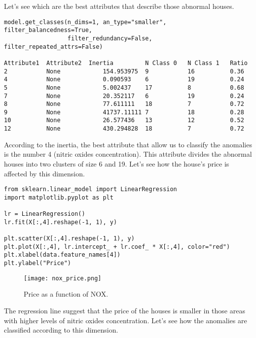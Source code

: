 Let's see which are the best attributes that describe those abnormal houses.

\begin{sourcecode}
{\scriptsize \begin{verbatim}
model.get_classes(n_dims=1, an_type="smaller", filter_balancedness=True,
                  filter_redundancy=False, filter_repeated_attrs=False)

Attribute1	Attribute2	Inertia	        N Class 0	N Class 1	Ratio
2	        None	        154.953975	9	        16	        0.36
4	        None   	        0.090593	6	        19	        0.24
5	        None	        5.002437	17	        8	        0.68
7	        None	        20.352117	6	        19	        0.24
8	        None	        77.611111	18	        7	        0.72
9	        None	        41737.11111	7	        18	        0.28
10	        None	        26.577436	13	        12	        0.52
12	        None	        430.294828	18	        7	        0.72
\end{verbatim}}
\end{sourcecode}

According to the inertia, the best attribute that allow us to classify the anomalies is the number 4 (nitric oxides concentration). This attribute divides the abnormal houses into two clusters of size 6 and 19. Let's see how the house's price is affected by this dimension.

\begin{sourcecode}
{\scriptsize \begin{verbatim}
from sklearn.linear_model import LinearRegression
import matplotlib.pyplot as plt
        
lr = LinearRegression()
lr.fit(X[:,4].reshape(-1, 1), y)
        
plt.scatter(X[:,4].reshape(-1, 1), y)
plt.plot(X[:,4], lr.intercept_ + lr.coef_ * X[:,4], color="red")
plt.xlabel(data.feature_names[4])
plt.ylabel("Price")
\end{verbatim}}
\end{sourcecode}

\begin{figure}[h]
\centering
\texttt{[image: nox\_price.png]}
\caption{Price as a function of NOX.}
\label{figure:nox_vs_price}
\end{figure}

The regression line suggest that the price of the houses is smaller in those areas with higher levels of nitric oxides concentration. Let's see how the anomalies are classified according to this dimension.

